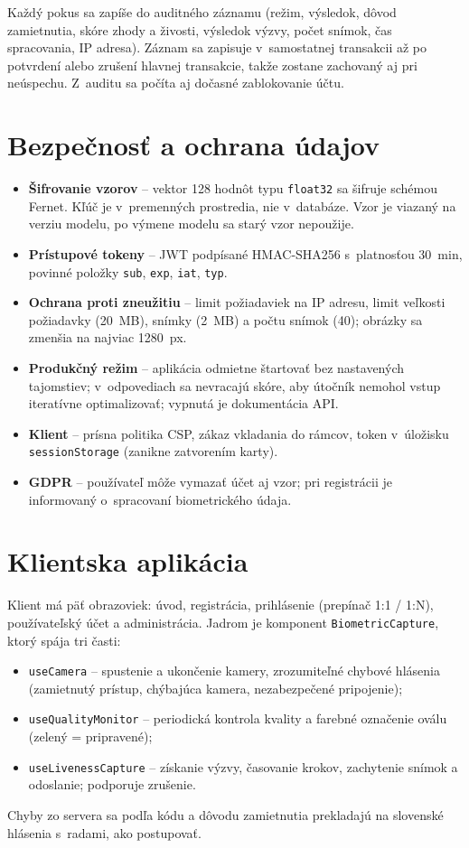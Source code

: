 Každý pokus sa zapíše do auditného záznamu (režim, výsledok, dôvod zamietnutia,
skóre zhody a živosti, výsledok výzvy, počet snímok, čas spracovania, IP adresa).
Záznam sa zapisuje v~samostatnej transakcii až po potvrdení alebo zrušení hlavnej
transakcie, takže zostane zachovaný aj pri neúspechu. Z~auditu sa počíta aj
dočasné zablokovanie účtu.

\section{Bezpečnosť a ochrana údajov}

\begin{itemize}
  \item \textbf{Šifrovanie vzorov} -- vektor 128 hodnôt typu \texttt{float32} sa šifruje
        schémou Fernet. Kľúč je v~premenných prostredia, nie v~databáze. Vzor je
        viazaný na verziu modelu, po výmene modelu sa starý vzor nepoužije.
  \item \textbf{Prístupové tokeny} -- JWT podpísané HMAC-SHA256 s~platnosťou 30~min,
        povinné položky \texttt{sub}, \texttt{exp}, \texttt{iat}, \texttt{typ}.
  \item \textbf{Ochrana proti zneužitiu} -- limit požiadaviek na IP adresu, limit veľkosti
        požiadavky (20~MB), snímky (2~MB) a počtu snímok (40); obrázky sa zmenšia na
        najviac 1280~px.
  \item \textbf{Produkčný režim} -- aplikácia odmietne štartovať bez nastavených
        tajomstiev; v~odpovediach sa nevracajú skóre, aby útočník nemohol vstup
        iteratívne optimalizovať; vypnutá je dokumentácia API.
  \item \textbf{Klient} -- prísna politika CSP, zákaz vkladania do rámcov, token v~úložisku
        \texttt{sessionStorage} (zanikne zatvorením karty).
  \item \textbf{GDPR} -- používateľ môže vymazať účet aj vzor; pri registrácii je
        informovaný o~spracovaní biometrického údaja.
\end{itemize}

\section{Klientska aplikácia}

Klient má päť obrazoviek: úvod, registrácia, prihlásenie (prepínač 1:1 / 1:N),
používateľský účet a administrácia. Jadrom je komponent \texttt{BiometricCapture},
ktorý spája tri časti:
\begin{itemize}
  \item \texttt{useCamera} -- spustenie a ukončenie kamery, zrozumiteľné chybové
        hlásenia (zamietnutý prístup, chýbajúca kamera, nezabezpečené pripojenie);
  \item \texttt{useQualityMonitor} -- periodická kontrola kvality a farebné označenie
        oválu (zelený = pripravené);
  \item \texttt{useLivenessCapture} -- získanie výzvy, časovanie krokov, zachytenie snímok
        a odoslanie; podporuje zrušenie.
\end{itemize}
Chyby zo servera sa podľa kódu a dôvodu zamietnutia prekladajú na slovenské hlásenia
s~radami, ako postupovať.

